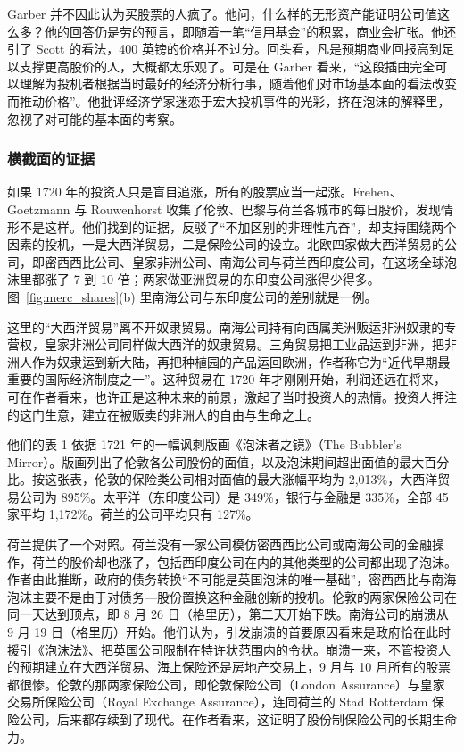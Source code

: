 Garber 并不因此认为买股票的人疯了。他问，什么样的无形资产能证明公司值这么多？他的回答仍是劳的预言，即随着一笔“信用基金”的积累，商业会扩张。他还引了 Scott 的看法，400 英镑的价格并不过分。回头看，凡是预期商业回报高到足以支撑更高股价的人，大概都太乐观了。可是在 Garber 看来，“这段插曲完全可以理解为投机者根据当时最好的经济分析行事，随着他们对市场基本面的看法改变而推动价格”\cite{garber1990}。他批评经济学家迷恋于宏大投机事件的光彩，挤在泡沫的解释里，忽视了对可能的基本面的考察\cite{garber1990}。

\subsubsection{横截面的证据}
如果 1720 年的投资人只是盲目追涨，所有的股票应当一起涨。Frehen、Goetzmann 与 Rouwenhorst 收集了伦敦、巴黎与荷兰各城市的每日股价，发现情形不是这样。他们找到的证据，反驳了“不加区别的非理性亢奋”，却支持围绕两个因素的投机，一是大西洋贸易，二是保险公司的设立\cite{fgr2009}。北欧四家做大西洋贸易的公司，即密西西比公司、皇家非洲公司、南海公司与荷兰西印度公司，在这场全球泡沫里都涨了 7 到 10 倍；两家做亚洲贸易的东印度公司涨得少得多\cite{fgr2009}。图~\ref{fig:merc_shares}(b) 里南海公司与东印度公司的差别就是一例。

这里的“大西洋贸易”离不开奴隶贸易。南海公司持有向西属美洲贩运非洲奴隶的专营权，皇家非洲公司同样做大西洋的奴隶贸易。三角贸易把工业品运到非洲，把非洲人作为奴隶运到新大陆，再把种植园的产品运回欧洲，作者称它为“近代早期最重要的国际经济制度之一”。这种贸易在 1720 年才刚刚开始，利润还远在将来，可在作者看来，也许正是这种未来的前景，激起了当时投资人的热情\cite{fgr2009}。投资人押注的这门生意，建立在被贩卖的非洲人的自由与生命之上。

他们的表 1 依据 1721 年的一幅讽刺版画《泡沫者之镜》（The Bubbler's Mirror）。版画列出了伦敦各公司股份的面值，以及泡沫期间超出面值的最大百分比\cite{fgr2009}。按这张表，伦敦的保险类公司相对面值的最大涨幅平均为 2,013\%，大西洋贸易公司为 895\%。太平洋（东印度公司）是 349\%，银行与金融是 335\%，全部 45 家平均 1,172\%。荷兰的公司平均只有 127\%\cite{fgr2009}。

荷兰提供了一个对照。荷兰没有一家公司模仿密西西比公司或南海公司的金融操作，荷兰的股价却也涨了，包括西印度公司在内的其他类型的公司都出现了泡沫。作者由此推断，政府的债务转换“不可能是英国泡沫的唯一基础”，密西西比与南海泡沫主要不是由于对债务—股份置换这种金融创新的投机\cite{fgr2009}。伦敦的两家保险公司在同一天达到顶点，即 8 月 26 日（格里历），第二天开始下跌。南海公司的崩溃从 9 月 19 日（格里历）开始。他们认为，引发崩溃的首要原因看来是政府恰在此时援引《泡沫法》、把英国公司限制在特许状范围内的令状。崩溃一来，不管投资人的预期建立在大西洋贸易、海上保险还是房地产交易上，9 月与 10 月所有的股票都很惨\cite{fgr2009}。伦敦的那两家保险公司，即伦敦保险公司（London Assurance）与皇家交易所保险公司（Royal Exchange Assurance），连同荷兰的 Stad Rotterdam 保险公司，后来都存续到了现代。在作者看来，这证明了股份制保险公司的长期生命力\cite{fgr2009}。

